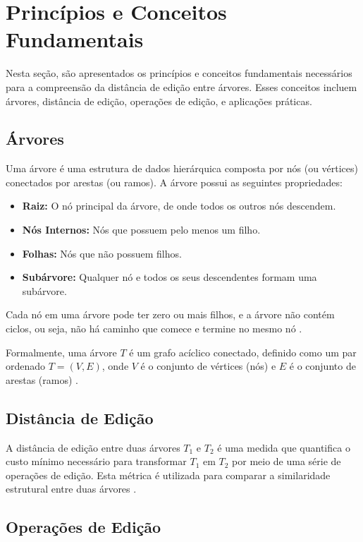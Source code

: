 \documentclass[12pt]{article}
\begin{document}
\section{Princípios e Conceitos Fundamentais}

Nesta seção, são apresentados os princípios e conceitos fundamentais necessários para a compreensão da distância de edição entre árvores. Esses conceitos incluem árvores, distância de edição, operações de edição, e aplicações práticas.

\subsection{Árvores}

Uma árvore é uma estrutura de dados hierárquica composta por nós (ou vértices) conectados por arestas (ou ramos). A árvore possui as seguintes propriedades:
\begin{itemize}
    \item \textbf{Raiz:} O nó principal da árvore, de onde todos os outros nós descendem.
    \item \textbf{Nós Internos:} Nós que possuem pelo menos um filho.
    \item \textbf{Folhas:} Nós que não possuem filhos.
    \item \textbf{Subárvore:} Qualquer nó e todos os seus descendentes formam uma subárvore.
\end{itemize}
Cada nó em uma árvore pode ter zero ou mais filhos, e a árvore não contém ciclos, ou seja, não há caminho que comece e termine no mesmo nó \cite{cormen2009introduction}.

Formalmente, uma árvore $T$ é um grafo acíclico conectado, definido como um par ordenado $T = (V, E)$, onde $V$ é o conjunto de vértices (nós) e $E$ é o conjunto de arestas (ramos) \cite{knuth1997art}.

\subsection{Distância de Edição}

A distância de edição entre duas árvores \( T_1 \) e \( T_2 \) é uma medida que quantifica o custo mínimo necessário para transformar \( T_1 \) em \( T_2 \) por meio de uma série de operações de edição. Esta métrica é utilizada para comparar a similaridade estrutural entre duas árvores \cite{zhang1989simple}.

\subsection{Operações de Edição}
\end{document}
